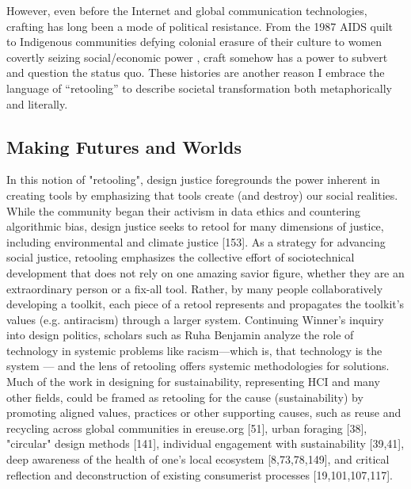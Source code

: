 However, even before the Internet and global communication technologies, crafting has long been a mode of political resistance. From the 1987 AIDS quilt \cite{newmeyer_knit_2008} to Indigenous communities defying colonial erasure of their culture \cite{feder-nadoff_performing_2022,muskrat_magazine_indigenous_2013,flores_weaving_2021} to women covertly seizing social/economic power \cite{barber_womens_1996,parker_subversive_2010,smith_bauhaus_2014}, craft somehow has a power to subvert and question the status quo. These histories are another reason I embrace the language of ``retooling'' to describe societal transformation both metaphorically and literally.

\subsection{Making Futures and Worlds}

In this notion of "retooling", design justice foregrounds the power inherent in creating tools by emphasizing that tools create (and destroy) our social realities. While the community began their activism in data ethics and countering algorithmic bias, design justice seeks to retool for many dimensions of justice, including environmental and climate justice [153]. As a strategy for advancing social justice, retooling emphasizes the collective effort of sociotechnical development that does not rely on one amazing savior figure, whether they are an extraordinary person or a fix-all tool. Rather, by many people collaboratively developing a toolkit, each piece of a retool represents and propagates the toolkit's values (e.g. antiracism) through a larger system. Continuing Winner's inquiry into design politics, scholars such as Ruha Benjamin analyze the role of technology in systemic problems like racism---which is, that technology is the system \cite{benjamin_race_2019} --- and the lens of retooling offers systemic methodologies for solutions. Much of the work in designing for sustainability, representing HCI and many other fields, could be framed as retooling for the cause (sustainability) by promoting aligned values, practices or other supporting causes, such as reuse and recycling across global communities in ereuse.org [51], urban foraging [38], "circular" design methods [141], individual engagement with sustainability [39,41], deep awareness of the health of one's local ecosystem [8,73,78,149], and critical reflection and deconstruction of existing consumerist processes [19,101,107,117].

